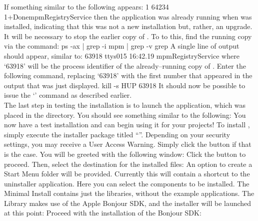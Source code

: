 If something similar to the following appears:
\outputBegin{}
\openSq{}1\closeSq{} 64234\\
\openSq{}1\closeSq{}+\hspace*{1em}Done\hspace*{8em}mpmRegistryService
\outputEnd{}
then the  application was already running when \mplusm{} was
installed, indicating that this was not a new installation but, rather, an upgrade.\\

It will be necessary to stop the earlier copy of .
To to this, find the running copy via the command:
\outputBegin{}
ps -ax | grep -i mpm | grep -v grep
\outputEnd{}
A single line of output should appear, similar to:
\outputBegin{}
63918 ttys015   16:42.19 mpmRegistryService
\outputEnd{}
where `63918' will be the process identifier of the already--running copy of
.
Enter the following command, replacing `63918' with the first number that appeared in the
output that was just displayed.
\outputBegin{}
kill -s HUP 63918
\outputEnd{}
It should now be possible to issue the `' command as
described earlier.\\

The last step in testing the \mplusm{} installation is to launch the
 application, which was placed in the 
directory.
You should see something similar to the following:
You now have a test \mplusm{} installation and can begin using it for your projects!
\tertiaryEnd{}
\secondaryEnd{}
\newpage
{}
To install \mplusm, simply execute the installer package titled
``''.
Depending on your security settings, you may receive a User Access Warning.
Simply click the  button if that is the case.
You will be greeted with the following window:
Click the  button to proceed.
\newpage
Then, select the destination for the installed files:
An option to create a Start Menu folder will be provided.
Currently this will contain a shortcut to the uninstaller application.
\newpage
Here you can select the components to be installed.
The Minimal Install contains just the libraries, without the example applications.
The \mplusm{} Library makes use of the Apple Bonjour SDK, and the installer will be
launched at this point:
\newpage
Proceed with the installation of the Bonjour SDK:


